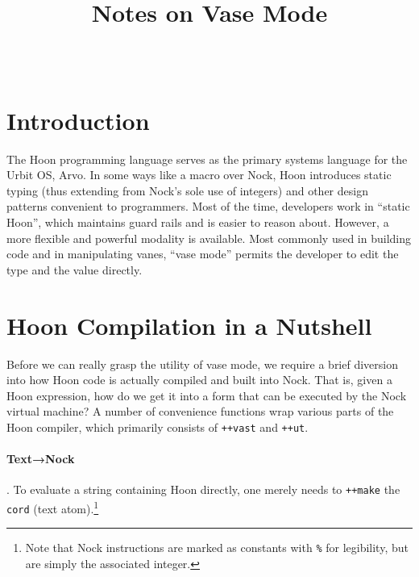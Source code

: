 \documentclass[twoside]{article}
\title{Notes on Vase Mode}
\author{\authorname~\authorpatp \\ \affiliation}
\date{}
\begin{document}
\maketitle
\thispagestyle{firststyle}

\begin{abstract}
\end{abstract}

\setcounter{page}{1}

\tableofcontents

\section{Introduction}

The Hoon programming language serves as the primary systems language for the Urbit OS, Arvo.  In some ways like a macro over Nock, Hoon introduces static typing (thus extending from Nock's sole use of integers) and other design patterns convenient to programmers.  Most of the time, developers work in “static Hoon”, which maintains guard rails and is easier to reason about.  However, a more flexible and powerful modality is available.  Most commonly used in building code and in manipulating vanes, “vase mode” permits the developer to edit the type and the value directly.

\section{Hoon Compilation in a Nutshell}

Before we can really grasp the utility of vase mode, we require a brief diversion into how Hoon code is actually compiled and built into Nock.  That is, given a Hoon expression, how do we get it into a form that can be executed by the Nock virtual machine?  A number of convenience functions wrap various parts of the Hoon compiler, which primarily consists of \lstinline[style=inlinecode]{++vast} and \lstinline[style=inlinecode]{++ut}.

\paragraph{Text→Nock}.  To evaluate a string containing Hoon directly, one merely needs to \lstinline[style=inlinecode]{++make} the \lstinline[style=inlinecode]{cord} (text atom).\footnote{Note that Nock instructions are marked as constants with \texttt{\%} for legibility, but are simply the associated integer.}
\end{document}
